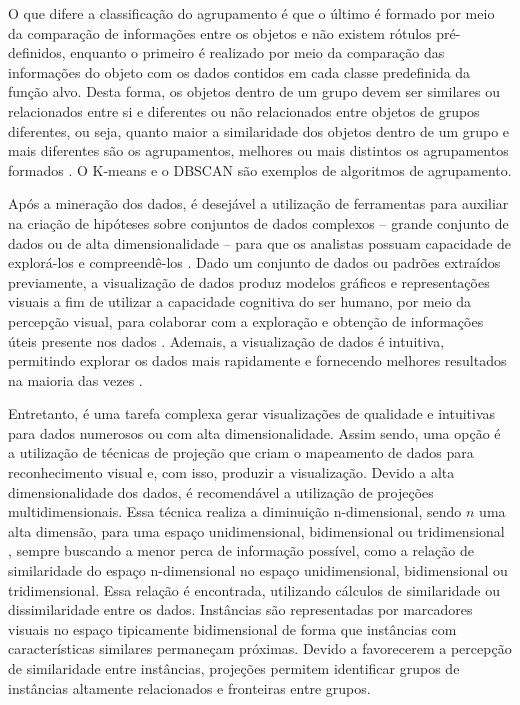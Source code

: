 		O que difere a classificação do agrupamento é que o último é formado por meio da
		comparação de informações entre os objetos e não existem rótulos pré-definidos,
		enquanto o primeiro é realizado por meio da comparação das informações do objeto
		com os dados contidos em cada classe predefinida da função alvo. Desta forma,
		os objetos dentro de um grupo devem ser similares ou relacionados entre si e
		diferentes ou não relacionados entre objetos de grupos diferentes, ou seja,
		quanto maior a similaridade dos objetos dentro de um grupo e mais diferentes
		são os agrupamentos, melhores ou mais distintos os agrupamentos formados \cite{Tan:2005:ch8}.
		O K-means \cite{macqueen1967} e o \ac{DBSCAN} \cite{Ester1996} são exemplos de
		algoritmos de agrupamento.

		Após a mineração dos dados, é desejável a utilização de ferramentas para
		auxiliar na criação de hipóteses sobre conjuntos de dados complexos -- grande
		conjunto de dados ou de alta dimensionalidade -- para que os analistas possuam
		capacidade de explorá-los e compreendê-los \cite{de2003}. Dado um conjunto de
		dados ou padrões extraídos previamente, a visualização de dados
		produz modelos gráficos e representações visuais a fim de utilizar a capacidade
		cognitiva do ser humano, por meio da percepção visual, para colaborar com
		a exploração e obtenção de informações úteis presente nos dados \cite{de2003,keim2002}.
		Ademais, a visualização de dados é intuitiva, permitindo explorar os dados
		mais rapidamente e fornecendo melhores resultados na maioria das vezes \cite{keim2002}.
		
		Entretanto, é uma tarefa complexa gerar visualizações de qualidade e intuitivas para
		dados numerosos ou com alta dimensionalidade. Assim sendo, uma opção é a utilização
		de técnicas de projeção que criam o mapeamento de dados para reconhecimento visual
		\cite{friedman1974} e, com isso, produzir a visualização. Devido a alta dimensionalidade
		dos dados, é recomendável a utilização de projeções multidimensionais. Essa técnica
		realiza a diminuição n-dimensional, sendo $n$ uma alta dimensão, para uma espaço
		unidimensional, bidimensional ou tridimensional \cite{paulovich2008least},
		sempre buscando a menor perca de informação possível, como a relação de
		similaridade do espaço n-dimensional no espaço unidimensional, bidimensional
		ou tridimensional. Essa relação é encontrada, utilizando cálculos de similaridade
		ou dissimilaridade entre os dados. Instâncias são representadas por marcadores visuais 
		no espaço tipicamente bidimensional de forma que instâncias com características
		similares permaneçam próximas. Devido a favorecerem a percepção de similaridade
		entre instâncias, projeções permitem identificar grupos de instâncias altamente
		relacionados e fronteiras entre grupos.
		
